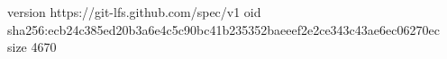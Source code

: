 version https://git-lfs.github.com/spec/v1
oid sha256:ecb24c385ed20b3a6e4c5c90bc41b235352baeeef2e2ce343c43ae6ec06270ec
size 4670
